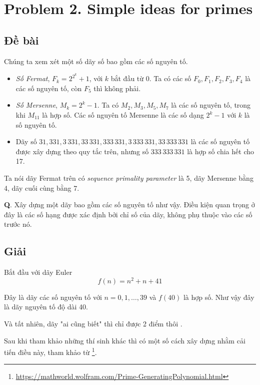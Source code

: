 \section*{Problem 2. Simple ideas for primes}

\subsection*{Đề bài}

Chúng ta xem xét một số dãy số bao gồm các số nguyên tố.

\begin{itemize}
    \item \textit{Số Fermat}, $F_k = 2^{2^k} + 1$, với $k$ bắt đầu từ 0. Ta có các số $F_0, F_1, F_2, F_3, F_4$ là các số nguyên tố, còn $F_5$ thì không phải.
    \item \textit{Số Mersenne}, $M_k = 2^k-1$. Ta có $M_2, M_3, M_5, M_7$ là các số nguyên tố, trong khi $M_{11}$ là hợp số. Các số nguyên tố Mersenne là các số dạng $2^k-1$ với $k$ là số nguyên tố.
    \item Dãy số $31, 331, 3\,331, 33\,331, 333\,331, 3\,333\,331, 33\,333\,331$ là các số nguyên tố được xây dựng theo quy tắc trên, nhưng số $333\,333\,331$ là hợp số chia hết cho 17.
\end{itemize}

Ta nói dãy Fermat trên có \textit{sequence primality parameter} là 5, dãy Mersenne bằng 4, dãy cuối cùng bằng 7.

\textbf{Q}. Xây dựng một dãy bao gồm các số nguyên tố như vậy. Điều kiện quan trọng ở đây là các số hạng được xác định bởi chỉ số của dãy, không phụ thuộc vào các số trước nó.

\subsection*{Giải}

Bắt đầu với dãy Euler
\begin{equation*}
    f(n) = n^2 + n + 41
\end{equation*}

Đây là dãy các số nguyên tố với $n=0, 1, \ldots, 39$ và $f(40)$ là hợp số. Như vậy đây là dãy nguyên tố độ dài 40.

Và tất nhiên, dãy "ai cũng biết" thì chỉ được 2 điểm thôi .

Sau khi tham khảo những thí sinh khác thì có một số cách xây dựng nhằm cải tiến điều này, tham khảo từ \footnote{\url{https://mathworld.wolfram.com/Prime-GeneratingPolynomial.html}}.

